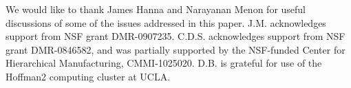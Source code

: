\documentclass[preprint,aps]{revtex4}
\begin{document}
\begin{acknowledgements}
We would like to thank James Hanna and Narayanan Menon for useful discussions of some of the issues addressed in this paper.  J.M. acknowledges support from NSF grant DMR-0907235. C.D.S. acknowledges support from NSF grant DMR-0846582, and was partially supported by the NSF-funded Center for Hierarchical Manufacturing, CMMI-1025020. D.B. is grateful for use of the Hoffman2 computing cluster at UCLA.
\end{acknowledgements}




\end{document}

